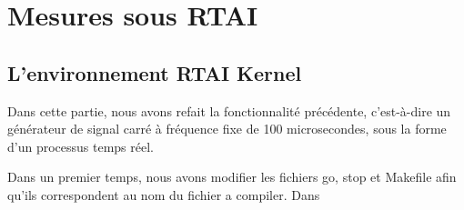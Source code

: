 \section{Mesures sous RTAI}
\subsection{L'environnement RTAI Kernel}
Dans cette partie, nous avons refait la fonctionnalité précédente, c'est-à-dire un générateur de signal carré à fréquence fixe  de 100 microsecondes, sous la forme d'un processus temps réel. 

Dans un premier temps, nous avons modifier les fichiers go, stop et Makefile afin qu'ils correspondent au nom du fichier a compiler. Dans 